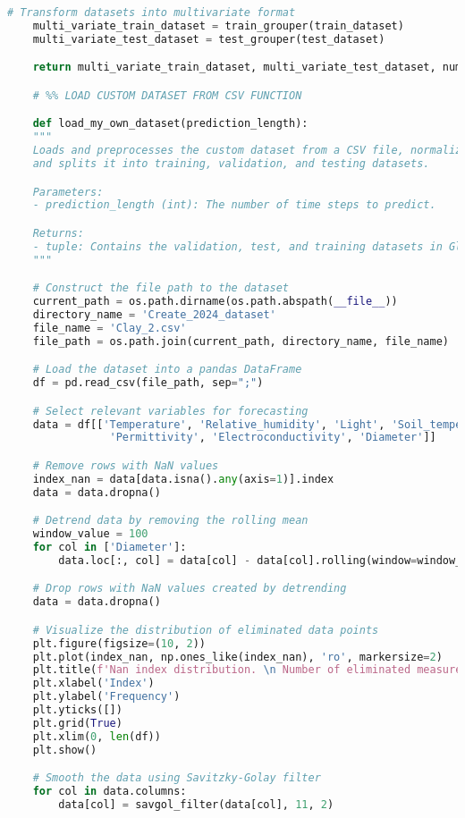 \begin{lstlisting}[language=Python, caption={Code for loading and preprocessing the time series data}, breaklines=true, label=code2]
    # Transform datasets into multivariate format
    multi_variate_train_dataset = train_grouper(train_dataset)
    multi_variate_test_dataset = test_grouper(test_dataset)

    return multi_variate_train_dataset, multi_variate_test_dataset, num_of_variates, test_dataset

    # %% LOAD CUSTOM DATASET FROM CSV FUNCTION

    def load_my_own_dataset(prediction_length):
    """
    Loads and preprocesses the custom dataset from a CSV file, normalizes the data, 
    and splits it into training, validation, and testing datasets.

    Parameters:
    - prediction_length (int): The number of time steps to predict.

    Returns:
    - tuple: Contains the validation, test, and training datasets in GluonTS format.
    """

    # Construct the file path to the dataset
    current_path = os.path.dirname(os.path.abspath(__file__))
    directory_name = 'Create_2024_dataset'
    file_name = 'Clay_2.csv'
    file_path = os.path.join(current_path, directory_name, file_name)

    # Load the dataset into a pandas DataFrame
    df = pd.read_csv(file_path, sep=";")

    # Select relevant variables for forecasting
    data = df[['Temperature', 'Relative_humidity', 'Light', 'Soil_temperature',
                'Permittivity', 'Electroconductivity', 'Diameter']]

    # Remove rows with NaN values
    index_nan = data[data.isna().any(axis=1)].index
    data = data.dropna()

    # Detrend data by removing the rolling mean
    window_value = 100
    for col in ['Diameter']:
        data.loc[:, col] = data[col] - data[col].rolling(window=window_value).mean()

    # Drop rows with NaN values created by detrending
    data = data.dropna()

    # Visualize the distribution of eliminated data points
    plt.figure(figsize=(10, 2))
    plt.plot(index_nan, np.ones_like(index_nan), 'ro', markersize=2)
    plt.title(f'Nan index distribution. \n Number of eliminated measurements: {len(index_nan)}')
    plt.xlabel('Index')
    plt.ylabel('Frequency')
    plt.yticks([])
    plt.grid(True)
    plt.xlim(0, len(df))
    plt.show()

    # Smooth the data using Savitzky-Golay filter
    for col in data.columns:
        data[col] = savgol_filter(data[col], 11, 2)


\end{lstlisting}
